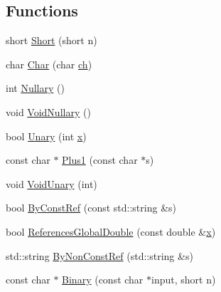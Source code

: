 \subsection*{Functions}
\begin{DoxyCompactItemize}
\item 
short \mbox{\hyperlink{namespacetesting_1_1gmock__more__actions__test_a00503d3168f1123e314c0d42b7e10b88}{Short}} (short n)
\item 
char \mbox{\hyperlink{namespacetesting_1_1gmock__more__actions__test_af69e6906d734a99d60480e4291891d66}{Char}} (char \mbox{\hyperlink{_obj__test_2lib_2googletest-master_2googlemock_2test_2gmock-matchers__test_8cc_af53f92900705f7de3c139a05b2f9ef16}{ch}})
\item 
int \mbox{\hyperlink{namespacetesting_1_1gmock__more__actions__test_acdd2dd80f777fdb770b513b63064ac19}{Nullary}} ()
\item 
void \mbox{\hyperlink{namespacetesting_1_1gmock__more__actions__test_a061f6d66383a4e793b4d4ca93bd8ca2f}{Void\+Nullary}} ()
\item 
bool \mbox{\hyperlink{namespacetesting_1_1gmock__more__actions__test_aad456ea2ee1b0cb2741b676a34f540a3}{Unary}} (int \mbox{\hyperlink{_obj__test_2lib_2googletest-master_2googlemock_2test_2gmock-matchers__test_8cc_a6150e0515f7202e2fb518f7206ed97dc}{x}})
\item 
const char $\ast$ \mbox{\hyperlink{namespacetesting_1_1gmock__more__actions__test_a7ffa7fd75ffadf90e8ec8867e5cb53cf}{Plus1}} (const char $\ast$s)
\item 
void \mbox{\hyperlink{namespacetesting_1_1gmock__more__actions__test_a163632ef644604032f00334fce36de1a}{Void\+Unary}} (int)
\item 
bool \mbox{\hyperlink{namespacetesting_1_1gmock__more__actions__test_a38903b39cda75bfa5c932f4abec7a0ca}{By\+Const\+Ref}} (const std\+::string \&s)
\item 
bool \mbox{\hyperlink{namespacetesting_1_1gmock__more__actions__test_ae2d3dddc96f5657127593f129cd3fc51}{References\+Global\+Double}} (const double \&\mbox{\hyperlink{_obj__test_2lib_2googletest-master_2googlemock_2test_2gmock-matchers__test_8cc_a6150e0515f7202e2fb518f7206ed97dc}{x}})
\item 
std\+::string \mbox{\hyperlink{namespacetesting_1_1gmock__more__actions__test_acfdfdaebbbbfc2f9129f29b10cb42eee}{By\+Non\+Const\+Ref}} (std\+::string \&s)
\item 
const char $\ast$ \mbox{\hyperlink{namespacetesting_1_1gmock__more__actions__test_ad772cefe4443030c4b50e0d497d0edbb}{Binary}} (const char $\ast$input, short n)

\end{DoxyCompactItemize}
